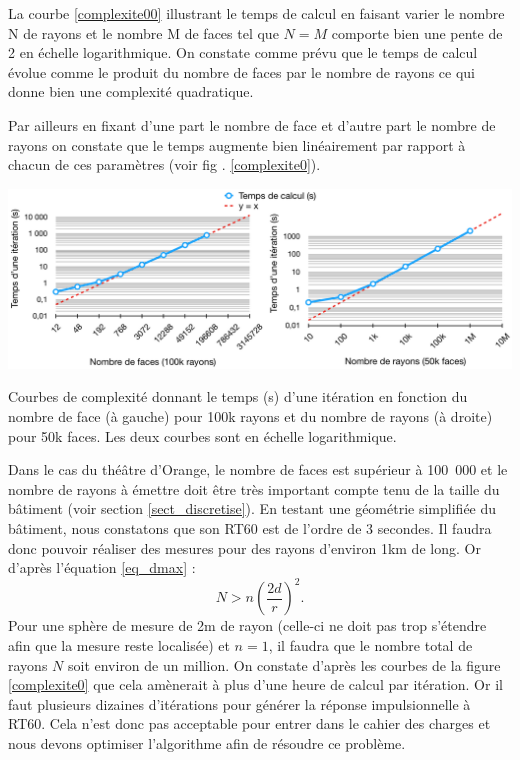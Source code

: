 La courbe \ref{complexite00} illustrant le temps de calcul en faisant varier le nombre N de rayons et le nombre M de faces tel que $N=M$ comporte bien une pente de 2 en échelle logarithmique. On constate comme prévu que le temps de calcul évolue comme le produit du nombre de faces par le nombre de rayons ce qui donne bien une complexité quadratique. 

Par ailleurs en fixant d'une part le nombre de face et d'autre part le nombre de rayons on constate que le temps augmente bien linéairement par rapport à chacun de ces paramètres (voir fig . \ref{complexite0}).

 \begin{figureth}
	\includegraphics[width=\linewidth]{images/complexite0}
	\caption{Courbes de complexité donnant le temps (s) d'une itération en fonction du nombre de face (à gauche) pour 100k rayons et du nombre de rayons (à droite) pour 50k faces. Les deux courbes sont en échelle logarithmique.}
	\label{complexite0}
\end{figureth}


Dans le cas du théâtre d'Orange, le nombre de faces est supérieur à 100~000 et le nombre de rayons à émettre doit être très important compte tenu de la taille du bâtiment (voir section \ref{sect_discretise}). En testant une géométrie simplifiée du bâtiment, nous constatons que son \gls{RT60} est de l'ordre de 3 secondes. Il faudra donc pouvoir réaliser des mesures pour des rayons d'environ 1km de long. Or d'après l'équation \ref{eq_dmax} :
%
\begin{equation}
N > n\left(\frac{2d}{r}\right)^2.
\end{equation}
%
Pour une sphère de mesure de 2m de rayon (celle-ci ne doit pas trop s'étendre afin que la mesure reste localisée) et $n=1$, il faudra que le nombre total de rayons $N$ soit environ de un million. On constate d'après les courbes de la figure \ref{complexite0} que cela amènerait à plus d'une heure de calcul par itération. Or il faut plusieurs dizaines d'itérations pour générer la réponse impulsionnelle à \gls{RT60}. Cela n'est donc pas acceptable pour entrer dans le cahier des charges et nous devons optimiser l'algorithme afin de résoudre ce problème.

